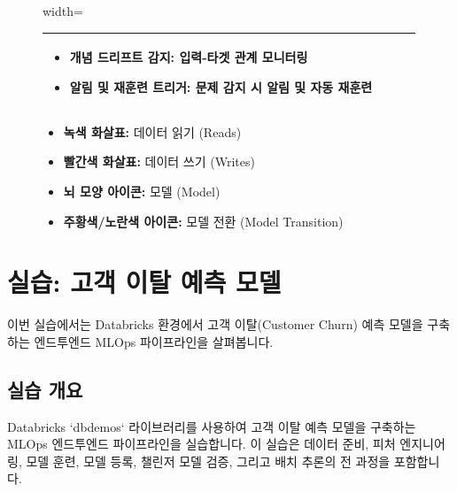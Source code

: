 \documentclass[11pt,a4paper]{article}
\begin{document}
\begin{figure}[h!]
\begin{adjustbox}{width=\textwidth}
\begin{tabular}{p{} | p{} | p{} | p{}}
\begin{itemize}
        \item \textbf{개념 드리프트 감지:} 입력-타겟 관계 모니터링
        \item \textbf{알림 및 재훈련 트리거:} 문제 감지 시 알림 및 자동 재훈련
    \end{itemize} \\
    \bottomrule
    \end{tabular}
    \end{adjustbox}
    \vspace{1em}
    \begin{itemize}
        \item \textbf{녹색 화살표:} 데이터 읽기 (Reads)
        \item \textbf{빨간색 화살표:} 데이터 쓰기 (Writes)
        \item \textbf{뇌 모양 아이콘:} 모델 (Model)
        \item \textbf{주황색/노란색 아이콘:} 모델 전환 (Model Transition)
    \end{itemize}
\end{figure}

\newpage
\section{실습: 고객 이탈 예측 모델}

이번 실습에서는 Databricks 환경에서 고객 이탈(Customer Churn) 예측 모델을 구축하는 엔드투엔드 MLOps 파이프라인을 살펴봅니다.

\subsection{실습 개요}

\begin{summarybox}
Databricks `dbdemos` 라이브러리를 사용하여 고객 이탈 예측 모델을 구축하는 MLOps 엔드투엔드 파이프라인을 실습합니다. 이 실습은 데이터 준비, 피처 엔지니어링, 모델 훈련, 모델 등록, 챌린저 모델 검증, 그리고 배치 추론의 전 과정을 포함합니다.
\end{summarybox}
\end{document}
